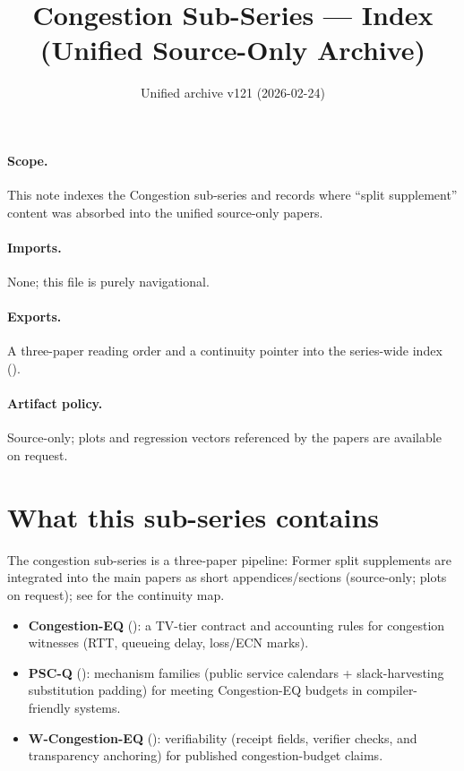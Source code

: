 \documentclass[11pt]{article}
\title{Congestion Sub-Series --- Index (Unified Source-Only Archive)}
\author{}
\date{Unified archive v121 (2026-02-24)}
\begin{document}
\maketitle

\paragraph{Scope.}
This note indexes the Congestion sub-series and records where ``split supplement'' content was absorbed into the unified source-only papers.

\paragraph{Imports.}
None; this file is purely navigational.

\paragraph{Exports.}
A three-paper reading order and a continuity pointer into the series-wide index ().

\paragraph{Artifact policy.}
Source-only; plots and regression vectors referenced by the papers are available on request.



\section*{What this sub-series contains}
The congestion sub-series is a three-paper pipeline:
Former split supplements are integrated into the main papers as short appendices/sections (source-only; plots on request); see  for the continuity map.
\begin{itemize}[leftmargin=1.2em]
\item \textbf{Congestion-EQ} (): a TV-tier contract and accounting rules for congestion witnesses (RTT, queueing delay, loss/ECN marks).
\item \textbf{PSC-Q} (): mechanism families (public service calendars + slack-harvesting substitution padding) for meeting Congestion-EQ budgets in compiler-friendly systems.
\item \textbf{W-Congestion-EQ} (): verifiability (receipt fields, verifier checks, and transparency anchoring) for published congestion-budget claims.
\end{itemize}
\end{document}
